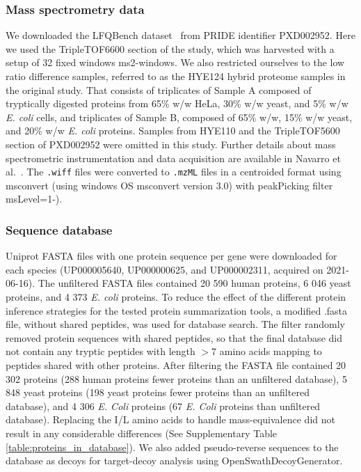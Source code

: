 \documentclass[10pt,letterpaper]{article}
\begin{document}
\subsubsection*{Mass spectrometry data}


We downloaded the LFQBench dataset~\cite{navarro2016multicenter} from PRIDE identifier PXD002952. Here we used the TripleTOF6600 section of the study, which was harvested with a setup of 32 fixed windows ms2-windows. We also restricted ourselves to the low ratio difference samples, referred to as the HYE124 hybrid proteome samples in the original study. That consists of triplicates of Sample A composed of tryptically digested proteins from 65\% w/w HeLa, 30\% w/w yeast, and 5\% w/w \textit{E. coli} cells, and triplicates of Sample B, composed of 65\% w/w, 15\% w/w yeast, and 20\% w/w \textit{E. coli} proteins. Samples from HYE110 and the TripleTOF5600 section of PXD002952 were omitted in this study. Further details about mass spectrometric instrumentation and data acquisition are available in Navarro et al.~\cite{navarro2016multicenter}. The \verb|.wiff| files were converted to \verb|.mzML| files in a centroided format using msconvert (using windows OS msconvert version 3.0) with peakPicking filter msLevel=1-). 


\subsubsection*{Sequence database}

Uniprot FASTA files with one protein sequence per gene were downloaded for each species (UP000005640, UP000000625, and UP000002311, acquired on 2021-06-16). The unfiltered FASTA files contained 20 590 human proteins, 6 046 yeast proteins, and 4 373 \textit{E. coli} proteins. To reduce the effect of the different protein inference strategies for the tested protein summarization tools, a modified .fasta file, without shared peptides, was used for database search. The filter randomly removed protein sequences with shared peptides, so that the final database did not contain any tryptic peptides with length $>$7 amino acids mapping to peptides shared with other proteins. After filtering the FASTA file contained 20 302 proteins (288 human proteins fewer proteins than an unfiltered database), 5 848 yeast proteins (198 yeast proteins fewer proteins than an unfiltered database), and 4 306 \textit{E. Coli} proteins (67 \textit{E. Coli} proteins than unfiltered database). Replacing the I/L amino acids to handle mass-equivalence did not result in any considerable differences (See Supplementary Table \ref{table:proteins_in_database}). We also added pseudo-reverse sequences to the database as decoys for target-decoy analysis using OpenSwathDecoyGenerator. 
\end{document}

